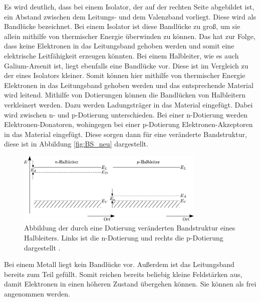 Es wird deutlich, dass bei einem Isolator, der auf der rechten Seite abgebildet ist, ein Abstand zwischen 
dem Leitungs- und dem Valenzband vorliegt. Diese wird als Bandlücke bezeichnet. Bei einem Isolator ist diese
Bandlücke zu groß, um sie allein mithilfe von thermischer Energie überwinden zu können. Das hat zur Folge, 
dass keine Elektronen in das Leitungsband gehoben werden und somit eine elektrische Leitfähigkeit erzeugen könnten. 
Bei einem Halbleiter, wie es auch Galium-Arsenit ist, liegt ebenfalls eine Bandlücke vor. Diese ist im Vergleich 
zu der eines Isolators kleiner. Somit können hier mithilfe von thermischer Energie Elektronen in das Leitungsband 
gehoben werden und das entsprechende Material wird leitend. Mithilfe von Dotierungen können die Bandlücken 
von Halbleitern verkleinert werden. Dazu werden Ladungsträger in das Material eingefügt. Dabei wird zwischen 
n- und p-Dotierung unterschieden. Bei einer n-Dotierung werden Elektronen-Donatoren, wohingegen bei einer p-Dotierung
Elektronen-Akzeptoren in das Material eingefügt. Diese sorgen dann für eine veränderte Bandstruktur, diese 
ist in Abbildung \ref{fig:BS_neu} dargestellt. \\
\begin{figure}[H]
    \centering
    \includegraphics[width=0.8\textwidth]{images/BS_neu.png}
    \caption{Abbildung der durch eine Dotierung veränderten Bandstruktur eines Halbleiters. Links ist die n-Dotierung und rechts 
    die p-Dotierung dargestellt \cite{BS_neu}.}
    \label{}
\end{figure} \noindent
Bei einem Metall liegt kein Bandlücke vor. Außerdem ist das Leitungsband bereits zum Teil gefüllt. Somit reichen
bereits beliebig kleine Feldstärken aus, damit Elektronen in einen höheren Zustand übergehen können. Sie können 
als frei angenommen werden. 

